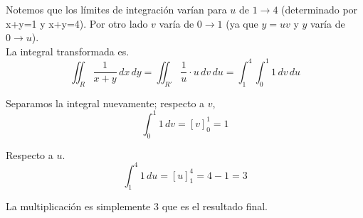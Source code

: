 Notemos que los límites de integración varían para $u$ de $1 \rightarrow 4$ (determinado por x+y=1 y x+y=4). Por otro lado $v$ varía de $0 \rightarrow 1$ (ya que $y=uv$ y $y$ varía de $0 \rightarrow u$). \\

La integral transformada es.
\[
   \iint_{R} \frac{1}{x+y} \, dx \, dy = \iint_{R'} \frac{1}{u} \cdot u \, dv \, du = \int_{1}^{4} \int_{0}^{1} 1 \, dv \, du
   \]

Separamos la integral nuevamente; respecto a $v$,
\[
     \int_{0}^{1} 1 \, dv = [v]_{0}^{1} = 1
     \]

Respecto a $u$.
\[
     \int_{1}^{4} 1 \, du = [u]_{1}^{4} = 4 - 1 = 3
     \]

La multiplicación es simplemente 3 que es el resultado final.\\\\